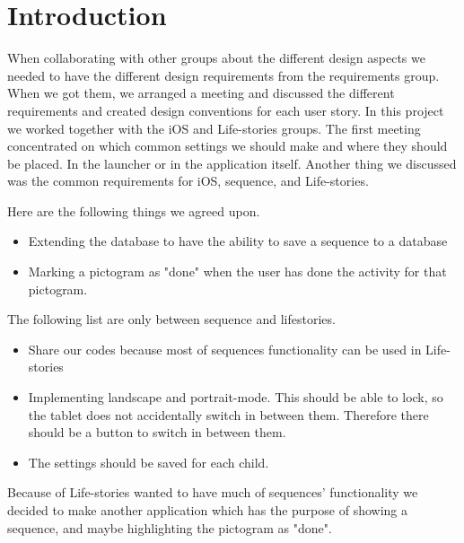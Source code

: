 \section{Introduction}\label{sec:collab:Introduction}

\label{sec:collab}
When collaborating with other groups about the different design aspects we needed to have the different design requirements from the requirements group.
When we got them, we arranged a meeting and discussed the different requirements and created design conventions for each user story.
In this project we worked together with the iOS and Life-stories groups.
The first meeting concentrated on which common settings we should make and where they should be placed. In the launcher or in the application itself. 
Another thing we discussed was the common requirements for iOS, sequence, and Life-stories. 

Here are the following things we agreed upon.
\begin{itemize}
\item Extending the database to have the ability to save a sequence to a database
\item Marking a pictogram as "done" when the user has done the activity for that pictogram.
\end{itemize}

The following list are only between sequence and lifestories. 
\begin{itemize}
\item Share our codes because most of sequences functionality can be used in Life-stories
\item Implementing landscape and portrait-mode. This should be able to lock, so the tablet does not accidentally switch in between them. Therefore there should be a button to switch in between them.
\item The settings should be saved for each child.
\end{itemize}

Because of Life-stories wanted to have much of sequences' functionality we decided to make another application which has the purpose of showing a sequence, and maybe highlighting the pictogram as "done".


